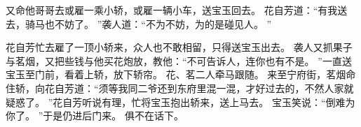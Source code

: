 又命他哥哥去或雇一乘小轿，或雇一辆小车，送宝玉回去。
花自芳道：“有我送去，骑马也不妨了。
”袭人道：“不为不妨，为的是碰见人。
”\par
花自芳忙去雇了一顶小轿来，众人也不敢相留，只得送宝玉出去。
袭人又抓果子与茗烟，又把些钱与他买花炮放，教他：“不可告诉人，连你也有不是。
”一直送宝玉至门前，看着上轿，放下轿帘。
花、茗二人牵马跟随。
来至宁府街，茗烟命住轿，向花自芳道：“须等我同二爷还到东府里混一混，才好过去的，不然人家就疑惑了。
”花自芳听说有理，忙将宝玉抱出轿来，送上马去。
宝玉笑说：“倒难为你了。
”于是仍进后门来。
俱不在话下。
\par


